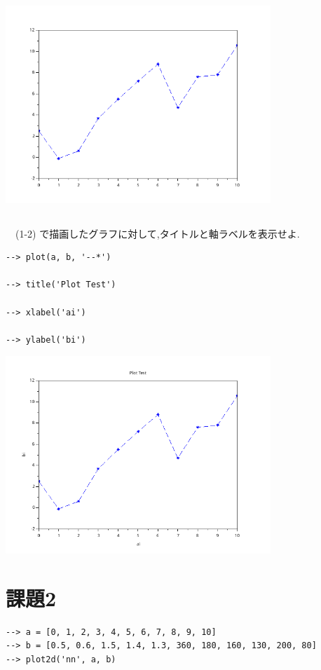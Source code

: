 \documentclass{scrartcl}
\begin{document}
\begin{center}
\includegraphics[width=10cm]{./1-2.png}
\end{center}
\subsection{}
\label{sec:org27ab35b}
　(1-2) で描画したグラフに対して,タイトルと軸ラベルを表示せよ.\\
\begin{verbatim}
--> plot(a, b, '--*')

--> title('Plot Test')

--> xlabel('ai')

--> ylabel('bi')
\end{verbatim}

\begin{center}
\includegraphics[width=10cm]{./1-3.png}
\end{center}
\section{課題2}
\label{sec:org8e0a32b}
\begin{verbatim}
--> a = [0, 1, 2, 3, 4, 5, 6, 7, 8, 9, 10]
--> b = [0.5, 0.6, 1.5, 1.4, 1.3, 360, 180, 160, 130, 200, 80]
--> plot2d('nn', a, b)
\end{verbatim}
\end{document}
